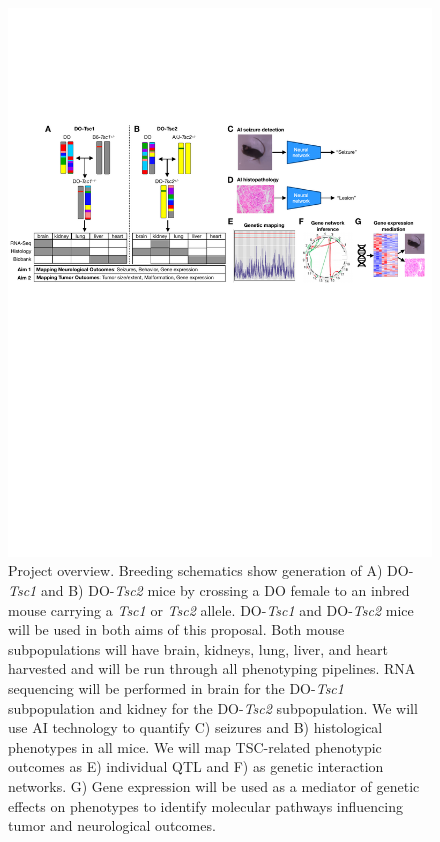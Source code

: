 \documentclass[
  12pt,
]{article}
\begin{document}
\begin{figure}[ht!]
\includegraphics[width=\textwidth]{Fig1.pdf} 
\caption{Project overview. Breeding schematics show generation of A) DO-\textit{Tsc1} and B) DO-\textit{Tsc2} mice by crossing a DO female to an inbred mouse carrying a \textit{Tsc1} or \textit{Tsc2} allele. DO-\textit{Tsc1} and DO-\textit{Tsc2} mice will be used in both aims of this proposal. Both mouse subpopulations will have brain, kidneys, lung, liver, and heart harvested and will be run through all phenotyping pipelines. RNA sequencing will be performed in brain for the DO-\textit{Tsc1} subpopulation and kidney for the DO-\textit{Tsc2} subpopulation. We will use AI technology to quantify C) seizures and B) histological phenotypes in all mice. We will map TSC-related phenotypic outcomes as E) individual QTL and F) as genetic interaction networks. G) Gene expression will be used as a mediator of genetic effects on phenotypes to identify molecular pathways influencing tumor and neurological outcomes.
}
\label{fig:overview}
\end{figure}
\end{document}
